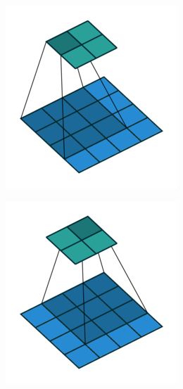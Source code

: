 \begin{figure}[h]
  \begin{subfigure}[b]{0.24\textwidth}
    \includegraphics[width=\textwidth]{figures/no_padding_no_strides_00}
  \end{subfigure}
  \begin{subfigure}[b]{0.24\textwidth}
    \includegraphics[width=\textwidth]{figures/no_padding_no_strides_01}

\end{subfigure}
\end{figure}

